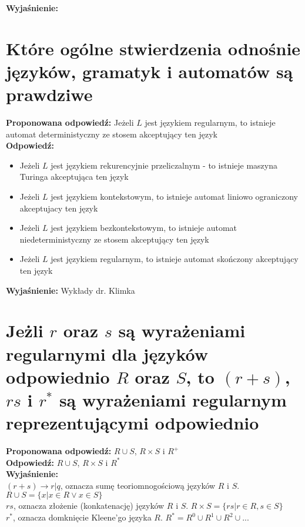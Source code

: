 \noindent \textbf{Wyjaśnienie:}


\section{Które ogólne stwierdzenia odnośnie języków, gramatyk i automatów są prawdziwe} 

\vspace{0.4cm}
\noindent \textbf{Proponowana odpowiedź:} Jeżeli $L$ jest językiem regularnym, to istnieje automat deterministyczny ze stosem akceptujący ten język \\ 

\noindent \textbf{Odpowiedź:}  \\ 
\begin{itemize}
	\item Jeżeli $L$ jest językiem rekurencyjnie przeliczalnym - to istnieje maszyna Turinga akceptująca ten język
	\item Jeżeli $L$ jest językiem kontekstowym, to istnieje automat liniowo ograniczony akceptujacy ten język
	\item Jeżeli $L$ jest językiem bezkontekstowym, to istnieje automat niedeterministyczny ze stosem akceptujący ten język
	\item Jeżeli $L$ jest językiem regularnym, to istnieje automat skończony akceptujący ten język
\end{itemize}

\noindent \textbf{Wyjaśnienie:}
Wykłady dr. Klimka

\section{Jeżli $r$ oraz $s$ są wyrażeniami regularnymi dla języków odpowiednio $R$ oraz $S$, to $(r+s)$, $rs$ i $r^*$ są wyrażeniami regularnym reprezentującymi odpowiednio} 

\vspace{0.4cm}
\noindent \textbf{Proponowana odpowiedź:} $R \cup S$, $R \times S$ i $R^+$\\ 

\noindent \textbf{Odpowiedź:}  $R \cup S$, $R \times S$ i $R^*$\\  

\noindent \textbf{Wyjaśnienie:}\\
$(r+s) \rightarrow r | q$, oznacza sumę teoriomnogościową języków $R$ i $S$. $R \cup S = \{x | x \in R \lor x \in S\}$ \\
$rs$, oznacza złożenie (konkatenację) języków $R$ i $S$. $R \times S = \{rs | r \in R, s \in S\}$ \\
$r^*$, oznacza domknięcie Kleene'go języka $R$. $R^* = R^0 \cup R^1 \cup R^2 \cup ...$  
